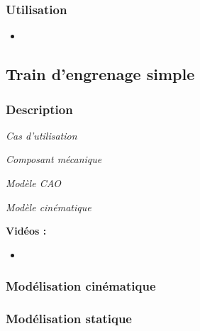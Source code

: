 \documentclass[11pt,oneside]{article}
\begin{document}
\subsubsection{Utilisation}
\begin{itemize}
\item
\end{itemize}
\newpage

\subsection{Train d'engrenage simple}
\subsubsection{Description}

\begin{center}
\hfill
\begin{minipage}[c]{.21\linewidth}
\begin{center}
\textit{Cas d'utilisation}
\end{center}
\end{minipage} \hfill
\begin{minipage}[c]{.21\linewidth}
\begin{center}
\textit{Composant mécanique}
\end{center}
\end{minipage} \hfill
\begin{minipage}[c]{.21\linewidth}
\begin{center}
\textit{Modèle CAO}
\end{center} 
\end{minipage}\hfill
\begin{minipage}[c]{.21\linewidth}
\begin{center}
\textit{Modèle cinématique}
\end{center} 
\end{minipage}\hfill
\end{center}


\textbf{Vidéos :}
\begin{itemize}
\item
\end{itemize}

\subsubsection{Modélisation cinématique}
\subsubsection{Modélisation statique}
\end{document}
